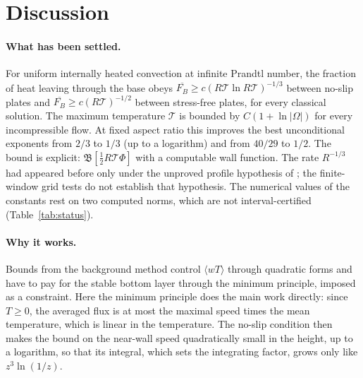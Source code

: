 \section{Discussion}\label{sec:discussion}

\paragraph{What has been settled.} For uniform internally heated convection at infinite Prandtl number, the
fraction of heat leaving through the base obeys $\overline{F_B}\ge c(R\mathcal T\ln R\mathcal T)^{-1/3}$
between no-slip plates and $\overline{F_B}\ge c(R\mathcal T)^{-1/2}$ between stress-free plates, for every
classical solution. The maximum temperature $\mathcal T$ is bounded by $C(1+\ln|\Omega|)$ for every incompressible flow. At
fixed aspect ratio this improves the best unconditional exponents from $2/3$ to $1/3$ (up to a logarithm) and from
$40/29$ to $1/2$. The bound is explicit: $\mathfrak B[\frac12R\mathcal T\Phi]$ with a computable wall function. The
rate $R^{-1/3}$ had appeared before only under the unproved profile hypothesis of \citet{ChenEtAl2024}; the finite-window grid tests do not establish that hypothesis. The numerical values of the constants rest on two
computed norms, which are not interval-certified (Table~\ref{tab:status}).

\paragraph{Why it works.} Bounds from the background method control $\langle wT\rangle$ through quadratic forms
and have to pay for the stable bottom layer through the minimum principle, imposed as a constraint. Here the
minimum principle does the main work directly: since $T\ge0$, the averaged flux is at most the maximal speed times
the mean temperature, which is linear in the temperature. The no-slip condition then makes the bound on the
near-wall speed quadratically small in the height, up to a logarithm, so that its integral, which sets the
integrating factor, grows only like $z^3\ln(1/z)$.

